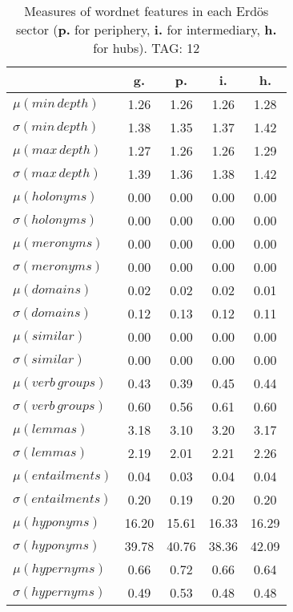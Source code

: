 \begin{table}[h!]
\begin{center}
\begin{tabular}{| l || c | c | c | c |}\hline
 & {\bf g.} & {\bf p.} & {\bf i.} & {\bf h.} \\\hline\hline
$\mu(min\,depth)$ & 1.26  & 1.26  & 1.26  & 1.28 \\
$\sigma(min\,depth)$ & 1.38  & 1.35  & 1.37  & 1.42 \\\hline
$\mu(max\,depth)$ & 1.27  & 1.26  & 1.26  & 1.29 \\
$\sigma(max\,depth)$ & 1.39  & 1.36  & 1.38  & 1.42 \\\hline
$\mu(holonyms)$ & 0.00  & 0.00  & 0.00  & 0.00 \\
$\sigma(holonyms)$ & 0.00  & 0.00  & 0.00  & 0.00 \\\hline
$\mu(meronyms)$ & 0.00  & 0.00  & 0.00  & 0.00 \\
$\sigma(meronyms)$ & 0.00  & 0.00  & 0.00  & 0.00 \\\hline
$\mu(domains)$ & 0.02  & 0.02  & 0.02  & 0.01 \\
$\sigma(domains)$ & 0.12  & 0.13  & 0.12  & 0.11 \\\hline
$\mu(similar)$ & 0.00  & 0.00  & 0.00  & 0.00 \\
$\sigma(similar)$ & 0.00  & 0.00  & 0.00  & 0.00 \\\hline
$\mu(verb\,groups)$ & 0.43  & 0.39  & 0.45  & 0.44 \\
$\sigma(verb\,groups)$ & 0.60  & 0.56  & 0.61  & 0.60 \\\hline
$\mu(lemmas)$ & 3.18  & 3.10  & 3.20  & 3.17 \\
$\sigma(lemmas)$ & 2.19  & 2.01  & 2.21  & 2.26 \\\hline
$\mu(entailments)$ & 0.04  & 0.03  & 0.04  & 0.04 \\
$\sigma(entailments)$ & 0.20  & 0.19  & 0.20  & 0.20 \\\hline
$\mu(hyponyms)$ & 16.20  & 15.61  & 16.33  & 16.29 \\
$\sigma(hyponyms)$ & 39.78  & 40.76  & 38.36  & 42.09 \\\hline
$\mu(hypernyms)$ & 0.66  & 0.72  & 0.66  & 0.64 \\
$\sigma(hypernyms)$ & 0.49  & 0.53  & 0.48  & 0.48 \\\hline
\end{tabular}
\caption{Measures of wordnet features in each Erd\"os sector ({{\bf p.}} for periphery, {{\bf i.}} for intermediary, {{\bf h.}} for hubs). TAG: 12}
\end{center}
\end{table}